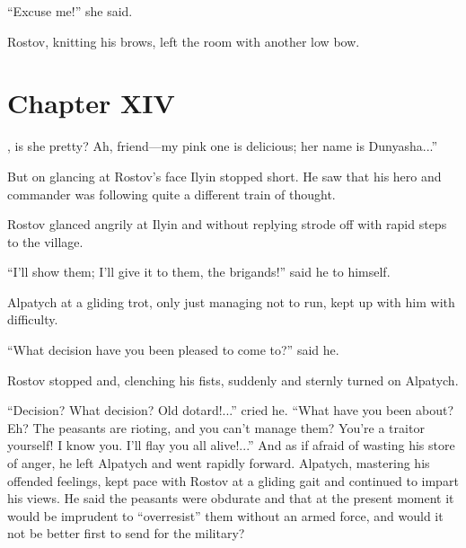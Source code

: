 ``Excuse me!'' she said.

Rostov, knitting his brows, left the room with another low bow.


\chapter*{Chapter XIV} \ifaudio {}
\fi

, is she pretty? Ah, friend---my pink one is delicious; her
name is Dunyasha...''

But on glancing at Rostov's face Ilyin stopped short. He saw that
his hero and commander was following quite a different train of
thought.

Rostov glanced angrily at Ilyin and without replying strode off
with rapid steps to the village.

``I'll show them; I'll give it to them, the brigands!'' said he
to himself.

Alpatych at a gliding trot, only just managing not to run, kept
up with him with difficulty.

``What decision have you been pleased to come to?'' said he.

Rostov stopped and, clenching his fists, suddenly and sternly
turned on Alpatych.

``Decision? What decision? Old dotard!...'' cried he. ``What have
you been about? Eh? The peasants are rioting, and you can't
manage them? You're a traitor yourself! I know you. I'll flay you
all alive!...'' And as if afraid of wasting his store of anger,
he left Alpatych and went rapidly forward. Alpatych, mastering
his offended feelings, kept pace with Rostov at a gliding gait
and continued to impart his views. He said the peasants were
obdurate and that at the present moment it would be imprudent to
``overresist'' them without an armed force, and would it not be
better first to send for the military?

